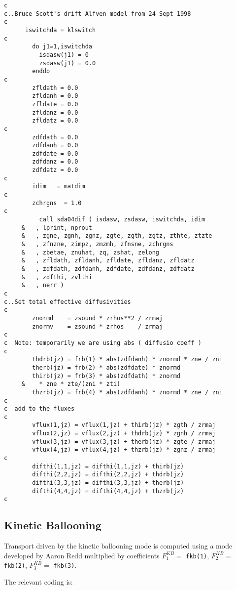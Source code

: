 \begin{verbatim}
c
c..Bruce Scott's drift Alfven model from 24 Sept 1998
c
      iswitchda = klswitch
c
        do j1=1,iswitchda
          isdasw(j1) = 0
          zsdasw(j1) = 0.0
        enddo
c
        zfldath = 0.0
        zfldanh = 0.0
        zfldate = 0.0
        zfldanz = 0.0
        zfldatz = 0.0
c
        zdfdath = 0.0
        zdfdanh = 0.0
        zdfdate = 0.0
        zdfdanz = 0.0
        zdfdatz = 0.0
c
        idim   = matdim
c
        zchrgns  = 1.0
c
          call sda04dif ( isdasw, zsdasw, iswitchda, idim
     &   , lprint, nprout
     &   , zgne, zgnh, zgnz, zgte, zgth, zgtz, zthte, ztzte
     &   , zfnzne, zimpz, zmzmh, zfnsne, zchrgns
     &   , zbetae, znuhat, zq, zshat, zelong
     &   , zfldath, zfldanh, zfldate, zfldanz, zfldatz
     &   , zdfdath, zdfdanh, zdfdate, zdfdanz, zdfdatz
     &   , zdfthi, zvlthi
     &   , nerr )
c
c..Set total effective diffusivities
c
        znormd    = zsound * zrhos**2 / zrmaj
        znormv    = zsound * zrhos    / zrmaj
c
c  Note: temporarily we are using abs ( diffusio coeff )
c
        thdrb(jz) = frb(1) * abs(zdfdanh) * znormd * zne / zni
        therb(jz) = frb(2) * abs(zdfdate) * znormd
        thirb(jz) = frb(3) * abs(zdfdath) * znormd
     &    * zne * zte/(zni * zti)
        thzrb(jz) = frb(4) * abs(zdfdanh) * znormd * zne / zni
c
c  add to the fluxes
c
        vflux(1,jz) = vflux(1,jz) + thirb(jz) * zgth / zrmaj
        vflux(2,jz) = vflux(2,jz) + thdrb(jz) * zgnh / zrmaj
        vflux(3,jz) = vflux(3,jz) + therb(jz) * zgte / zrmaj
        vflux(4,jz) = vflux(4,jz) + thzrb(jz) * zgnz / zrmaj
c
        difthi(1,1,jz) = difthi(1,1,jz) + thirb(jz)
        difthi(2,2,jz) = difthi(2,2,jz) + thdrb(jz)
        difthi(3,3,jz) = difthi(3,3,jz) + therb(jz)
        difthi(4,4,jz) = difthi(4,4,jz) + thzrb(jz)
c

\end{verbatim}

\subsection{Kinetic Ballooning}

Transport driven by the kinetic ballooning mode is computed using
a mode developed by Aaron Redd \cite{redd98b}
multiplied by coefficients $F_1^{KB}=$ {\tt fkb(1)}, $F_2^{KB}=$ {\tt fkb(2)},
$F_3^{KB}=$ {\tt fkb(3)}.

The relevant coding is:

